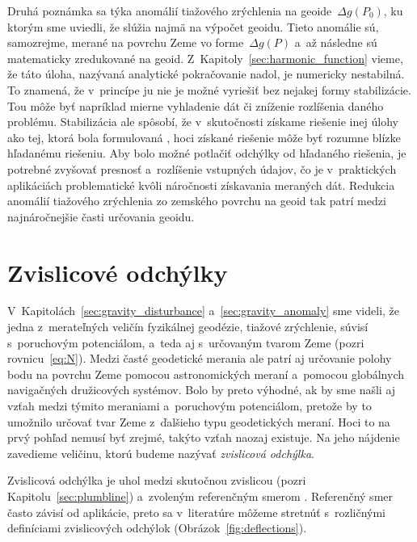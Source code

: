 \documentclass[a4paper,12pt]{book}
\begin{document}
Druhá poznámka sa týka anomálií tiažového zrýchlenia na geoide~$\Delta g(P_0)$, 
ku ktorým sme uviedli, že slúžia najmä na výpočet geoidu.  Tieto anomálie sú, 
samozrejme, merané na povrchu Zeme vo forme~$\Delta g(P)$ a~až následne sú 
matematicky zredukované na geoid.  Z~Kapitoly~\ref{sec:harmonic_function} 
vieme, že táto úloha, nazývaná analytické pokračovanie nadol, je numericky 
nestabilná.  To znamená, že v~princípe ju nie je možné vyriešiť bez nejakej 
formy stabilizácie.  Tou môže byť napríklad mierne vyhladenie dát či zníženie 
rozlíšenia daného problému.  Stabilizácia ale spôsobí, že v~skutočnosti získame 
riešenie inej úlohy ako tej, ktorá bola formulovaná 
\parencite{SansoGeodeticBoundaryValueProblem}, hoci získané riešenie môže byť 
rozumne blízke hľadanému riešeniu.  Aby bolo možné potlačiť odchýlky od 
hľadaného riešenia, je potrebné zvyšovať presnosť a~rozlíšenie vstupných 
údajov, čo je v~praktických aplikáciách problematické kvôli náročnosti 
získavania meraných dát.  Redukcia anomálií tiažového zrýchlenia zo zemského 
povrchu na geoid tak patrí medzi najnáročnejšie časti určovania geoidu.






\section{Zvislicové odchýlky}
\label{sec:deflections}

V~Kapitolách~\ref{sec:gravity_disturbance} a~\ref{sec:gravity_anomaly} sme 
videli, že jedna z~merateľných veličín fyzikálnej geodézie, tiažové zrýchlenie, 
súvisí s~poruchovým potenciálom, a~teda aj s~určovaným tvarom Zeme (pozri 
rovnicu~\ref{eq:N}).  Medzi časté geodetické merania ale patrí aj určovanie 
polohy bodu na povrchu Zeme pomocou astronomických meraní a~pomocou globálnych 
navigačných družicových systémov.  Bolo by preto výhodné, ak by sme našli aj 
vzťah medzi týmito meraniami a~poruchovým potenciálom, pretože by to umožnilo 
určovať tvar Zeme z~ďalšieho typu geodetických meraní.  Hoci to na prvý pohľad 
nemusí byť zrejmé, takýto vzťah naozaj existuje.  Na jeho nájdenie zavedieme 
veličinu, ktorú budeme nazývať \emph{zvislicová odchýlka}.

Zvislicová odchýlka je uhol medzi skutočnou zvislicou (pozri 
Kapitolu~\ref{sec:plumbline}) a~zvoleným referenčným smerom 
\parencite{TorgeGeodesy}.  Referenčný smer často závisí od aplikácie, preto sa 
v~literatúre môžeme stretnúť s~rozličnými definíciami zvislicových odchýlok 
(Obrázok~\ref{fig:deflections}).
\end{document}
